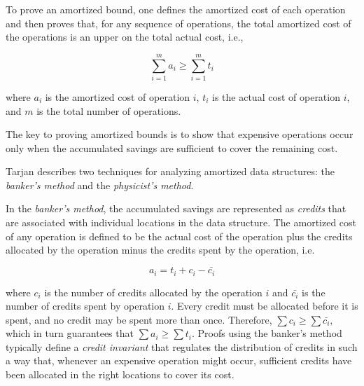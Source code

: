 \documentclass[12pt, a4paper]{article} %
\begin{document}
To prove an amortized bound, one defines the amortized cost of each operation and then proves that, for any sequence of operations, the total amortized cost of the operations is an upper on the total actual cost, i.e.,

\begin{equation}%
\label{amortized cost formula}
  \sum_{i=1}^m a_i \geq \sum_{i=1}^m t_i
\end{equation}

where $a_i$ is the amortized cost of operation $i$, $t_i$ is the actual cost of operation $i$, and $m$ is the total number of operations.



The key to proving amortized bounds is to show that expensive operations occur only when the accumulated savings are sufficient to cover the remaining cost.

Tarjan \cite{tar85} describes two techniques for analyzing amortized data structures: the \textit{banker's method} and the \textit{physicist's method}.

In the \textit{banker's method}, the accumulated savings are represented as \textit{credits} that are associated with individual locations in the data structure. The amortized cost of any operation is defined to be the actual cost of the operation plus the credits allocated by the operation minus the credits spent by the operation, i.e.

\begin{equation}%
\label{banker's method equation}
  a_i = t_i + c_i - \bar{c_i}
\end{equation}

where $c_i$ is the number of credits allocated by the operation $i$ and $\bar{c_i}$ is the number of credits spent by operation $i$. Every credit must be allocated before it is spent, and no credit may be spent more than once. Therefore, $\sum c_i \geq \sum \bar{c_i}$, which in turn guarantees that $\sum a_i \geq \sum t_i$. Proofs using the banker's method typically define a \textit{credit invariant} that regulates the distribution of credits in such a way that, whenever an expensive operation might occur, sufficient credits have been allocated in the right locations to cover its cost.
\end{document}
